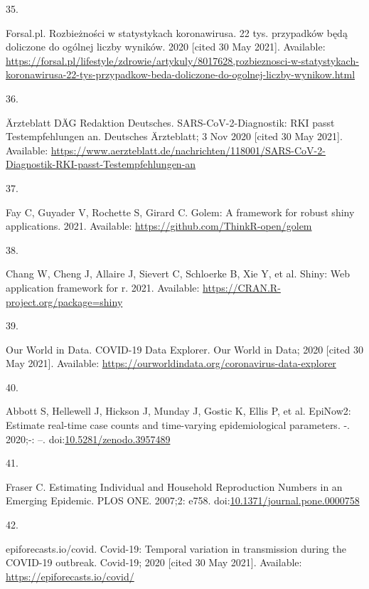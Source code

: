 \documentclass[10pt,letterpaper]{article}
\newlength{\cslhangindent}
\newlength{\csllabelwidth}
\newlength{\cslentryspacingunit} %
\newenvironment{CSLReferences}[2] %
 {%
  \setlength{\parindent}{0pt}
  \ifodd #1
  \let\oldpar\par
  \def\par{\hangindent=\cslhangindent\oldpar}
  \fi
  \setlength{\parskip}{#2\cslentryspacingunit}
 }%
 {}
\newcommand{\CSLLeftMargin}[1]{\parbox[t]{\csllabelwidth}{#1}}
\newcommand{\CSLRightInline}[1]{\parbox[t]{\linewidth - \csllabelwidth}{#1}\break}
\begin{document}
\begin{CSLReferences}{0}{0}
\leavevmode{}%
\CSLLeftMargin{35. }%
\CSLRightInline{Forsal.pl. Rozbieżności w statystykach koronawirusa. 22
tys. przypadków będą doliczone do ogólnej liczby wyników. 2020 {[}cited
30 May 2021{]}. Available:
\url{https://forsal.pl/lifestyle/zdrowie/artykuly/8017628,rozbieznosci-w-statystykach-koronawirusa-22-tys-przypadkow-beda-doliczone-do-ogolnej-liczby-wynikow.html}}

\leavevmode{}%
\CSLLeftMargin{36. }%
\CSLRightInline{Ärzteblatt DÄG Redaktion Deutsches.
SARS-CoV-2-Diagnostik: RKI passt Testempfehlungen an. {Deutsches
Ärzteblatt}; 3 Nov 2020 {[}cited 30 May 2021{]}. Available:
\url{https://www.aerzteblatt.de/nachrichten/118001/SARS-CoV-2-Diagnostik-RKI-passt-Testempfehlungen-an}}

\leavevmode{}%
\CSLLeftMargin{37. }%
\CSLRightInline{Fay C, Guyader V, Rochette S, Girard C. Golem: A
framework for robust shiny applications. 2021. Available:
\url{https://github.com/ThinkR-open/golem}}

\leavevmode{}%
\CSLLeftMargin{38. }%
\CSLRightInline{Chang W, Cheng J, Allaire J, Sievert C, Schloerke B, Xie
Y, et al. Shiny: Web application framework for r. 2021. Available:
\url{https://CRAN.R-project.org/package=shiny}}

\leavevmode{}%
\CSLLeftMargin{39. }%
\CSLRightInline{Our World in Data. {COVID-19 Data Explorer}. {Our World
in Data}; 2020 {[}cited 30 May 2021{]}. Available:
\url{https://ourworldindata.org/coronavirus-data-explorer}}

\leavevmode{}%
\CSLLeftMargin{40. }%
\CSLRightInline{Abbott S, Hellewell J, Hickson J, Munday J, Gostic K,
Ellis P, et al. EpiNow2: Estimate real-time case counts and time-varying
epidemiological parameters. -. 2020;-: --.
doi:\href{https://doi.org/10.5281/zenodo.3957489}{10.5281/zenodo.3957489}}

\leavevmode{}%
\CSLLeftMargin{41. }%
\CSLRightInline{Fraser C. Estimating {Individual} and {Household
Reproduction Numbers} in an {Emerging Epidemic}. PLOS ONE. 2007;2: e758.
doi:\href{https://doi.org/10.1371/journal.pone.0000758}{10.1371/journal.pone.0000758}}

\leavevmode{}%
\CSLLeftMargin{42. }%
\CSLRightInline{epiforecasts.io/covid. Covid-19: {Temporal} variation in
transmission during the {COVID-19} outbreak. {Covid-19}; 2020 {[}cited
30 May 2021{]}. Available: \url{https://epiforecasts.io/covid/}}


\end{CSLReferences}
\end{document}

